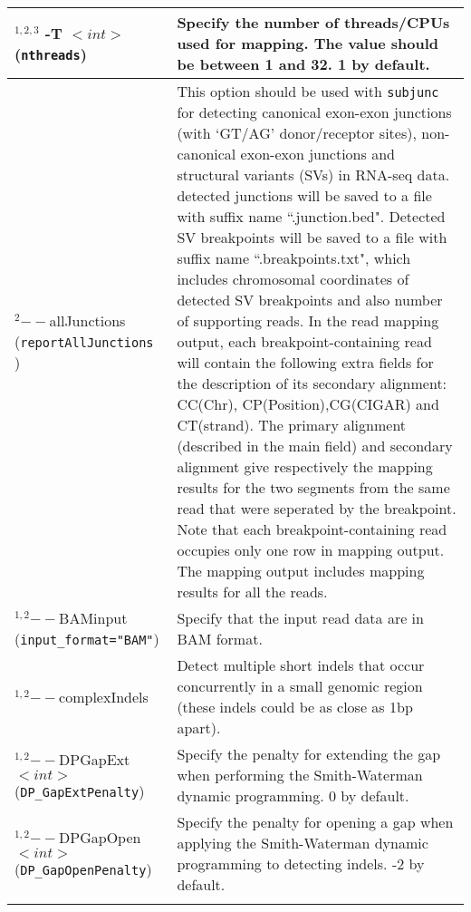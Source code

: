 \documentclass[12pt]{report}
\newcommand{\code}[1]{{\small\texttt{#1}}}
\begin{document}
\begin{longtable}{|p{5.5cm}|p{10.5cm}|}
\hline
$^{1,2,3}$ -T $<int>$ \newline (\code{nthreads}) & Specify the number of threads/CPUs used for mapping. The value should be between 1 and 32. 1 by default.\\
\hline
$^{2}$$--$allJunctions \newline (\code{reportAllJunctions} \newline \code{=TRUE}) & This option should be used with \code{subjunc} for detecting canonical exon-exon junctions (with `GT/AG' donor/receptor sites), non-canonical exon-exon junctions and structural variants (SVs) in RNA-seq data. detected junctions will be saved to a file with suffix name ``.junction.bed". Detected SV breakpoints will be saved to a file with suffix name ``.breakpoints.txt", which includes chromosomal coordinates of detected SV breakpoints and also number of supporting reads. In the read mapping output, each breakpoint-containing read will contain the following extra fields for the description of its secondary alignment: CC(Chr), CP(Position),CG(CIGAR) and CT(strand). The primary alignment (described in the main field) and secondary alignment give respectively the mapping results for the two segments from the same read that were seperated by the breakpoint. Note that each breakpoint-containing read occupies only one row in mapping output. The mapping output includes mapping results for all the reads.\\
\hline
$^{1,2}$$--$BAMinput \newline (\code{input\_format="BAM"}) & Specify that the input read data are in BAM format.\\
\hline
$^{1,2}$$--$complexIndels & Detect multiple short indels that occur concurrently in a small genomic region (these indels could be as close as 1bp apart).\\
\hline
$^{1,2}$$--$DPGapExt $<int>$ \newline (\code{DP\_GapExtPenalty}) & Specify the penalty for extending the gap when performing the Smith-Waterman dynamic programming. 0 by default.\\
\hline
$^{1,2}$$--$DPGapOpen $<int>$ \newline (\code{DP\_GapOpenPenalty}) & Specify the penalty for opening a gap when applying the Smith-Waterman dynamic programming to detecting indels. -2 by default.\\
$$
\end{longtable}
\end{document}

